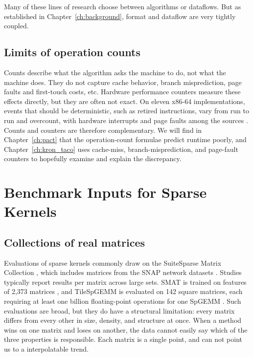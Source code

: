Many of these lines of research choose between algorithms or dataflows. But as established in Chapter~\ref{ch:background}, format and dataflow are
very tightly coupled.

\subsection{Limits of operation counts}
Counts describe what the algorithm asks the machine to do, not what the machine does. They do not capture cache behavior, branch misprediction, page faults and first-touch costs, etc. Hardware performance counters measure these effects directly, but they are often not exact. On eleven x86-64 implementations, events that should be deterministic, such as retired instructions, vary from run to run and overcount, with hardware interrupts and page faults among the sources \cite{weaver2013nondeterminism}. Counts and counters are therefore complementary. We will find in Chapter~\ref{ch:pact} that the operation-count formulae predict runtime poorly, and Chapter~\ref{ch:kron_taco} uses cache-miss, branch-misprediction, and page-fault counters to hopefully examine and explain the discrepancy.

\section{Benchmark Inputs for Sparse Kernels}
\label{sec:lit-inputs}

\subsection{Collections of real matrices}
Evaluations of sparse kernels commonly draw on the SuiteSparse Matrix Collection \cite{davis2011suitesparse,kolodziej2019suitesparse}, which includes matrices from the SNAP network datasets \cite{leskovec2014snap,leskovec2016snaplib}. Studies typically report results per matrix across large sets. SMAT is trained on features of 2,373 matrices \cite{li2013smat}, and TileSpGEMM is evaluated on 142 square matrices, each requiring at least one billion floating-point operations for one SpGEMM \cite{niu2022tilespgemm}. Such evaluations are broad, but they do have a structural limitation: every matrix differs from every other in size, density, and structure at once. When a method wins on one matrix and loses on another, the data cannot easily say which of the three properties is responsible. Each matrix is a single point, and can not point us to a interpolatable trend.

